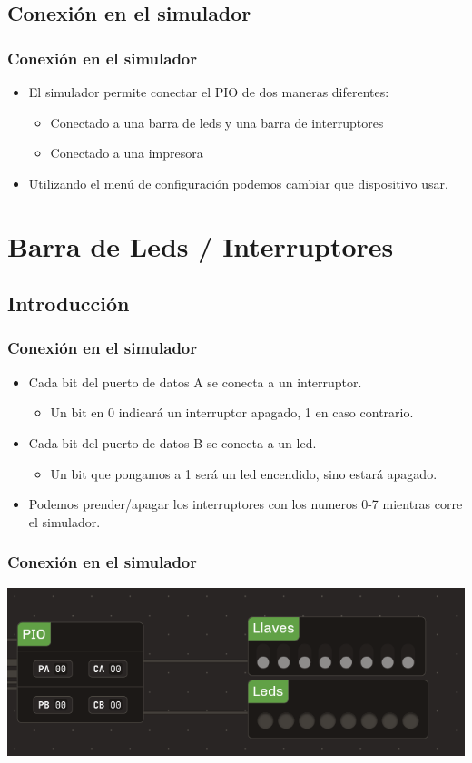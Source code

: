 \documentclass{beamer}
\begin{document}
\subsection{Conexión en el simulador}
\begin{frame}
\frametitle{Conexión en el simulador}
\begin{itemize}
  \item El simulador permite conectar el PIO de dos maneras diferentes:
  \begin{itemize}
    \item Conectado a una barra de leds y una barra de interruptores
    \item Conectado a una impresora
  \end{itemize}
  \item Utilizando el menú de configuración podemos cambiar que dispositivo usar.
\end{itemize}
\end{frame}

\section{Barra de Leds / Interruptores}
\subsection{Introducción}
\begin{frame}
\frametitle{Conexión en el simulador}
\begin{itemize}
  \item Cada bit del puerto de datos A se conecta a un interruptor.
  \begin{itemize}
      \item Un bit en 0 indicará un interruptor apagado, 1 en caso contrario.
\end{itemize}
  \item Cada bit del puerto de datos B se conecta a un led.
\begin{itemize}
      \item Un bit que pongamos a 1 será un led encendido, sino estará apagado.
\end{itemize}
  \item Podemos prender/apagar los interruptores con los numeros 0-7 mientras corre el simulador.
\end{itemize}
\end{frame}


\begin{frame}
\frametitle{Conexión en el simulador}
\begin{center}
 \includegraphics[scale=0.75]{pio0_vonsim.png}
\end{center}
\end{frame}
\end{document}
